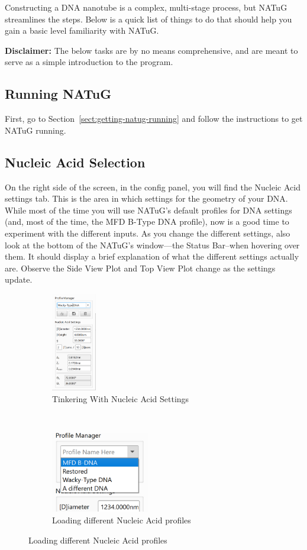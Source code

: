 \documentclass[titlepage]{article}
\begin{document}
Constructing a DNA nanotube is a complex, multi-stage process, but NATuG streamlines the steps. Below is a quick list of things to do that should help you gain a basic level familiarity with NATuG.

\textbf{Disclaimer:} The below tasks are by no means comprehensive, and are meant to serve as a simple introduction to the program.

\subsection{Running NATuG}
First, go to Section~\ref{sect:getting-natug-running} and follow the instructions to get NATuG running.

\subsection{Nucleic Acid Selection}

On the right side of the screen, in the config panel, you will find the Nucleic Acid settings tab. This is the area in which settings for the geometry of your DNA. While most of the time you will use NATuG's default profiles for DNA settings (and, most of the time, the MFD B-Type DNA profile), now is a good time to experiment with the different inputs. As you change the different settings, also look at the bottom of the NATuG's window---the Status Bar--when hovering over them. It should display a brief explanation of what the different settings actually are. Observe the Side View Plot and Top View Plot change as the settings update.

\begin{figure}[h] \label{fig:nucleic-acid-tinkering}
	\caption{Experimenting with Nucleic Acid settings}
	\centering
	\begin{subfigure}{.5\textwidth}
		\centering
		\includegraphics[height=1.7in]{nucleic-acid-tinkering.png}
		\caption{Tinkering With Nucleic Acid Settings}
	\end{subfigure}%
	~
	\begin{subfigure}{.5\textwidth}
		\centering
		\includegraphics[width=1.7in]{nucleic-acid-tinkering-2.png}
		\caption{Loading different Nucleic Acid profiles}
	\end{subfigure}
\end{figure}
	
\end{document}
